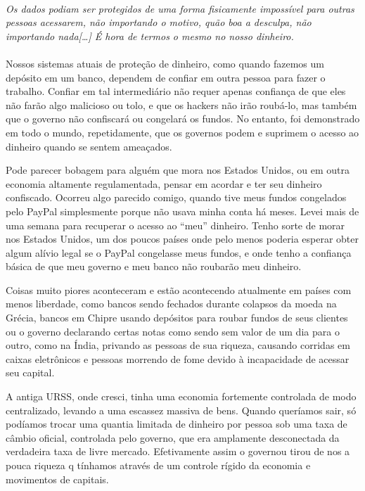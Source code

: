 \paragraph{}
\textit{Os dados podiam ser protegidos de uma forma fisicamente impossível para outras pessoas acessarem, não importando o motivo, quão boa a desculpa, não importando nada[\ldots] É hora de termos o mesmo no nosso dinheiro.}
\paragraph{}

Nossos sistemas atuais de proteção de dinheiro, como quando fazemos um depósito em um banco, dependem de confiar em outra pessoa para fazer o trabalho. Confiar em tal intermediário não requer apenas confiança de que eles não farão algo malicioso ou tolo, e que os hackers não irão roubá-lo, mas também que o governo não confiscará ou congelará os fundos. No entanto, foi demonstrado em todo o mundo, repetidamente, que os governos podem e suprimem o acesso ao dinheiro quando se sentem ameaçados.

Pode parecer bobagem para alguém que mora nos Estados Unidos, ou em outra economia altamente regulamentada, pensar em acordar e ter seu dinheiro confiscado. Ocorreu algo parecido comigo, quando tive meus fundos congelados pelo PayPal simplesmente porque não usava minha conta há meses. Levei mais de uma semana para recuperar o acesso ao “meu” dinheiro. Tenho sorte de morar nos Estados Unidos, um dos poucos países onde pelo menos poderia esperar obter algum alívio legal se o PayPal congelasse meus fundos, e onde tenho a confiança básica de que meu governo e meu banco não roubarão meu dinheiro.

Coisas muito piores aconteceram e estão acontecendo atualmente em países com menos liberdade, como bancos sendo fechados durante colapsos da moeda na Grécia, bancos em Chipre usando depósitos para roubar fundos de seus clientes ou o governo declarando certas notas como sendo sem valor de um dia para o outro, como na Índia, privando as pessoas de sua riqueza, causando corridas em caixas eletrônicos e pessoas morrendo de fome devido à incapacidade de acessar seu capital.

A antiga URSS, onde cresci, tinha uma economia fortemente controlada de modo centralizado, levando a uma escassez massiva de bens. Quando queríamos sair, só podíamos trocar uma quantia limitada de dinheiro por pessoa sob uma taxa de câmbio oficial, controlada pelo governo, que era amplamente desconectada da verdadeira taxa de livre mercado. Efetivamente assim o governou tirou de nos a pouca riqueza q tínhamos através de um controle rígido da economia e movimentos de capitais.


